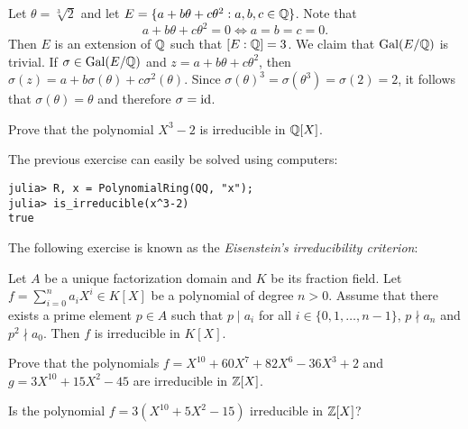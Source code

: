 \begin{example}
	Let $\theta=\sqrt[3]{2}$ and let $E=\{a+b\theta+c\theta^2:a,b,c\in\mathbb{Q}\}$. Note that 
\[
	a+b\theta+c\theta^2=0 \Longleftrightarrow a=b=c=0. 
\]
Then $E$ is an extension of $\mathbb{Q}$ such that $[E:\mathbb{Q}]=3$. We claim
that $\operatorname{Gal}(E/\mathbb{Q})$ is trivial. If 
$\sigma\in\operatorname{Gal}(E/\mathbb{Q})$ and $z=a+b\theta+c\theta^2$, then
$\sigma(z)=a+b\sigma(\theta)+c\sigma^2(\theta)$. Since
$\sigma(\theta)^3=\sigma(\theta^3)=\sigma(2)=2$, it follows
that $\sigma(\theta)=\theta$ and therefore
$\sigma=\operatorname{id}$. 
\end{example}

\begin{exercise}
    Prove that the polynomial $X^3-2$ is irreducible in $\mathbb{Q}[X]$.  
\end{exercise}

The previous exercise can easily be solved using
computers: 
\begin{lstlisting}
julia> R, x = PolynomialRing(QQ, "x");
julia> is_irreducible(x^3-2)
true
\end{lstlisting}

The following exercise is known as the 
\emph{Eisenstein's irreducibility criterion}:

\begin{exercise}
    Let $A$ be a unique factorization domain and $K$ be its fraction field. 
    Let $f=\sum_{i=0}^n a_iX^i\in K[X]$ be a polynomial of degree $n>0$. 
    Assume that there exists a prime element $p\in A$ such that
    $p\mid a_i$ for all $i\in\{0,1,\dots,n-1\}$, $p\nmid a_n$ and
    $p^2\nmid a_0$. Then $f$ is irreducible in $K[X]$. 
\end{exercise}

\begin{exercise}
    Prove that
    the polynomials 
    $f=X^{10}+60X^7+82X^6-36X^3+2$ and 
    $g=3X^{10}+15X^2-45$ are irreducible in $\mathbb{Z}[X]$. 
\end{exercise}

\begin{exercise}
    Is the polynomial $f=3(X^{10}+5X^2-15)$ irreducible in $\mathbb{Z}[X]$? 
\end{exercise}

